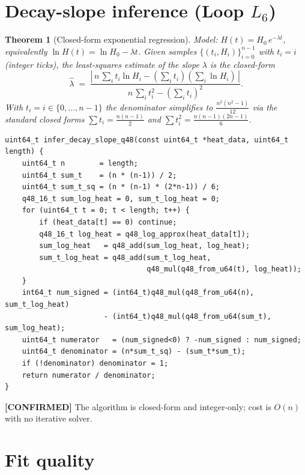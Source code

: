 \documentclass[11pt,letterpaper,openany]{book}
\theoremstyle{definition}
\theoremstyle{plain}
\newtheorem{theorem}[definition]{Theorem}
\newcommand{\confirmed}{\textcolor{green!50!black}{\textbf{[CONFIRMED]}}\xspace}
\newcommand{\Loop}[1]{L_{#1}}
\begin{document}
\section{Decay-slope inference (Loop \texorpdfstring{$\Loop{6}$}{L6})}
\label{sec:decay-regression}

\begin{theorem}[Closed-form exponential regression]\label{thm:decay-reg}
Model: $H(t) = H_0\,e^{-\lambda t}$, equivalently
$\ln H(t) = \ln H_0 - \lambda t$. Given samples $\{(t_i, H_i)\}_{i=0}^{n-1}$
with $t_i = i$ (integer ticks), the least-squares estimate of the slope
$\lambda$ is the closed-form
\begin{equation}\label{eq:slope}
  \hat\lambda \;=\;
  \frac{|\,n\,\sum_i t_i\ln H_i - (\sum_i t_i)(\sum_i \ln H_i)\,|}
       {n\,\sum_i t_i^2 - (\sum_i t_i)^2}.
\end{equation}
With $t_i = i \in \{0,\dots,n-1\}$ the denominator simplifies to
$\tfrac{n^2(n^2-1)}{12}$ via the standard closed forms
$\sum t_i = \tfrac{n(n-1)}{2}$ and
$\sum t_i^2 = \tfrac{n(n-1)(2n-1)}{6}$.
\end{theorem}

\begin{lstlisting}[caption={Decay-slope estimator
  (\texttt{src/inference\_engine.c}:458--505).}]
uint64_t infer_decay_slope_q48(const uint64_t *heat_data, uint64_t length) {
    uint64_t n        = length;
    uint64_t sum_t    = (n * (n-1)) / 2;
    uint64_t sum_t_sq = (n * (n-1) * (2*n-1)) / 6;
    q48_16_t sum_log_heat = 0, sum_t_log_heat = 0;
    for (uint64_t t = 0; t < length; t++) {
        if (heat_data[t] == 0) continue;
        q48_16_t log_heat = q48_log_approx(heat_data[t]);
        sum_log_heat   = q48_add(sum_log_heat, log_heat);
        sum_t_log_heat = q48_add(sum_t_log_heat,
                                 q48_mul(q48_from_u64(t), log_heat));
    }
    int64_t num_signed = (int64_t)q48_mul(q48_from_u64(n), sum_t_log_heat)
                       - (int64_t)q48_mul(q48_from_u64(sum_t), sum_log_heat);
    uint64_t numerator   = (num_signed<0) ? -num_signed : num_signed;
    uint64_t denominator = (n*sum_t_sq) - (sum_t*sum_t);
    if (!denominator) denominator = 1;
    return numerator / denominator;
}
\end{lstlisting}

\confirmed The algorithm is closed-form and integer-only; cost is
$O(n)$ with no iterative solver.

\section{Fit quality}
\end{document}
